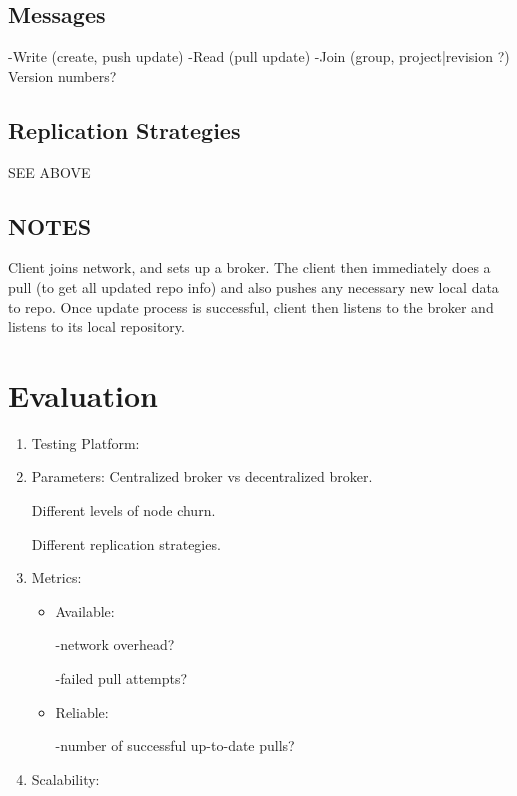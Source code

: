 \subsection{Messages}
-Write (create, push update)
-Read (pull update)
-Join (group, project|revision ?)
Version numbers?
\subsection{Replication Strategies}
SEE ABOVE
\subsection{NOTES}
Client joins network, and sets up a broker. The client then immediately does a pull (to get all updated repo info) and also pushes any necessary new local data to repo.
Once update process is successful, client then listens to the broker and listens to its local repository.

\section{Evaluation}
\begin{enumerate}
\item Testing Platform:
\item Parameters:
Centralized broker vs decentralized broker.

Different levels of node churn.

Different replication strategies.
\item Metrics:
\begin{itemize}
\item Available:

-network overhead?

-failed pull attempts?
\item Reliable:

-number of successful up-to-date pulls?
\end{itemize}
\item Scalability:
\end{enumerate}
